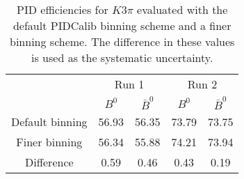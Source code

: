 \begin{table}
    \centering
    \begin{tabular}{ccccc}
    \toprule
& \multicolumn{2}{c}{Run 1} & \multicolumn{2}{c}{Run 2}\\
& $B^0$ & $\bar{B}^0$ & $B^0$ & $\bar{B}^0$\\
    \midrule
Default binning & 56.93 & 56.35 & 73.79 & 73.75\\
Finer binning & 56.34 & 55.88 & 74.21 & 73.94\\
Difference & 0.59 & 0.46 & 0.43 & 0.19\\
    \bottomrule
    \end{tabular}
    \caption{PID efficiencies for $K3\pi$ evaluated with the default PIDCalib binning scheme and a finer binning scheme. The difference in these values is used as the systematic uncertainty.}
\label{tab:final_PID_Kpipipi}
\end{table}

